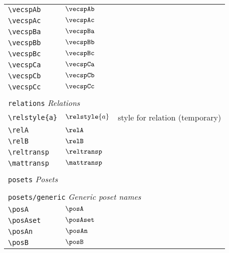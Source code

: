\begin{longtable}{lll}
 {\color[rgb]{0.5,0.5,0.5}\texttt{\textbackslash vecspAb}} & $\vecspAb$ & \\ 
 {\color[rgb]{0.5,0.5,0.5}\texttt{\textbackslash vecspAc}} & $\vecspAc$ & \\ 
 {\color[rgb]{0.5,0.5,0.5}\texttt{\textbackslash vecspBa}} & $\vecspBa$ & \\ 
 {\color[rgb]{0.5,0.5,0.5}\texttt{\textbackslash vecspBb}} & $\vecspBb$ & \\ 
 {\color[rgb]{0.5,0.5,0.5}\texttt{\textbackslash vecspBc}} & $\vecspBc$ & \\ 
 {\color[rgb]{0.5,0.5,0.5}\texttt{\textbackslash vecspCa}} & $\vecspCa$ & \\ 
 {\color[rgb]{0.5,0.5,0.5}\texttt{\textbackslash vecspCb}} & $\vecspCb$ & \\ 
 {\color[rgb]{0.5,0.5,0.5}\texttt{\textbackslash vecspCc}} & $\vecspCc$ & \\ 
  &  & \\ 
 \multicolumn{3}{l}{{\color[rgb]{0.5,0.5,0.5}\texttt{relations}} \emph{Relations}}\\ 
 \hline
\hline
{\color[rgb]{0.5,0.5,0.5}\texttt{\textbackslash relstyle\{a\}}} & $\relstyle{a}$ &  style for relation (temporary)\\ 
 {\color[rgb]{0.5,0.5,0.5}\texttt{\textbackslash relA}} & $\relA$ & \\ 
 {\color[rgb]{0.5,0.5,0.5}\texttt{\textbackslash relB}} & $\relB$ & \\ 
 {\color[rgb]{0.5,0.5,0.5}\texttt{\textbackslash reltransp}} & $\reltransp$ & \\ 
 {\color[rgb]{0.5,0.5,0.5}\texttt{\textbackslash mattransp}} & $\mattransp$ & \\ 
  &  & \\ 
 \multicolumn{3}{l}{{\color[rgb]{0.5,0.5,0.5}\texttt{posets}} \emph{Posets}}\\ 
 \hline
\hline
 &  & \\ 
 \multicolumn{3}{l}{{\color[rgb]{0.5,0.5,0.5}\texttt{posets/generic}} \emph{Generic poset names}}\\ 
 \hline
{\color[rgb]{0.5,0.5,0.5}\texttt{\textbackslash posA}} & $\posA$ & \\ 
 {\color[rgb]{0.5,0.5,0.5}\texttt{\textbackslash posAset}} & $\posAset$ & \\ 
 {\color[rgb]{0.5,0.5,0.5}\texttt{\textbackslash posAn}} & $\posAn$ & \\ 
 {\color[rgb]{0.5,0.5,0.5}\texttt{\textbackslash posB}} & $\posB$ & \\ 

\end{longtable}
